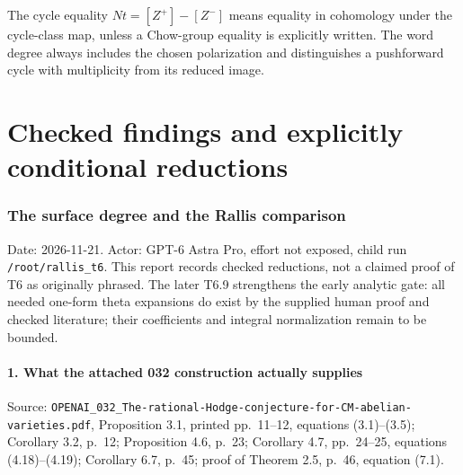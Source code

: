 \documentclass[11pt,a4paper]{article}
\theoremstyle{definition}
\begin{document}
The cycle equality $Nt=[Z^+]-[Z^-]$ means equality in cohomology under the
cycle-class map, unless a Chow-group equality is explicitly written. The
word degree always includes the chosen polarization and distinguishes a
pushforward cycle with multiplicity from its reduced image.

\part{Checked findings and explicitly conditional reductions}

\section{The surface degree and the Rallis comparison}

Date: 2026-11-21. Actor: GPT-6 Astra Pro, effort not exposed, child run
\texttt{/root/rallis\_t6}. This report records checked reductions, not a
claimed proof of T6 as originally phrased. The later T6.9 strengthens
the early analytic gate: all needed one-form theta expansions do exist
by the supplied human proof and checked literature; their coefficients
and integral normalization remain to be bounded.

\subsection{1. What the attached 032 construction actually
supplies}\label{what-the-attached-032-construction-actually-supplies}

Source:
\texttt{OPENAI\_032\_The-rational-Hodge-conjecture-for-CM-abelian-varieties.pdf},
Proposition 3.1, printed pp.~11--12, equations (3.1)--(3.5); Corollary
3.2, p.~12; Proposition 4.6, p.~23; Corollary 4.7, pp.~24--25, equations
(4.18)--(4.19); Corollary 6.7, p.~45; proof of Theorem 2.5, p.~46,
equation (7.1).
\end{document}
